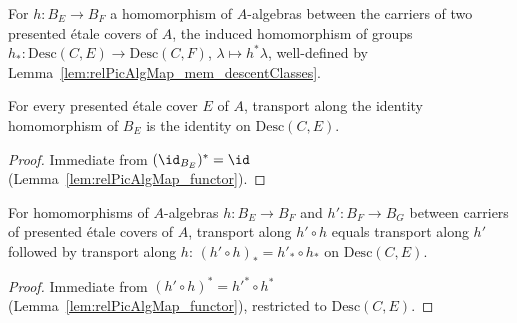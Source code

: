 \begin{definition}
  \label{def:descentMap}
  \leanok
  For \(h \colon B_E \to B_F\) a homomorphism of \(A\)-algebras between the carriers of two
  presented \'etale covers of \(A\), the induced homomorphism of groups \(h_{*} \colon
  \mathrm{Desc}(C,E) \to \mathrm{Desc}(C,F)\), \(\lambda \mapsto h^{*}\lambda\), well-defined by
  Lemma~\ref{lem:relPicAlgMap_mem_descentClasses}.
\end{definition}

\begin{lemma}
  \label{lem:descentMap_id}
  \leanok
  For every presented \'etale cover \(E\) of \(A\), transport along the identity homomorphism
  of \(B_E\) is the identity on \(\mathrm{Desc}(C,E)\).
\end{lemma}
\begin{proof}
  \leanok
  Immediate from \((\id_{B_E})^{*} = \id\) (Lemma~\ref{lem:relPicAlgMap_functor}).
\end{proof}

\begin{lemma}
  \label{lem:descentMap_comp}
  \leanok
  For homomorphisms of \(A\)-algebras \(h \colon B_E \to B_F\) and \(h' \colon B_F \to B_G\)
  between carriers of presented \'etale covers of \(A\), transport along \(h' \circ h\) equals
  transport along \(h'\) followed by transport along \(h\): \((h' \circ h)_{*} = h'_{*} \circ
  h_{*}\) on \(\mathrm{Desc}(C,E)\).
\end{lemma}
\begin{proof}
  \leanok
  Immediate from \((h' \circ h)^{*} = h'^{*} \circ h^{*}\) (Lemma~\ref{lem:relPicAlgMap_functor}),
  restricted to \(\mathrm{Desc}(C,E)\).
\end{proof}

